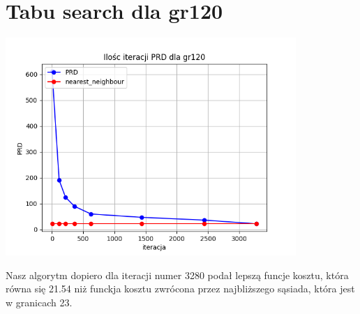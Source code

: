 \documentclass{article}
\begin{document}
    \section{Tabu search dla gr120}

    \includegraphics[width=11cm]{./spr2img/Figure_100.png}

    Nasz algorytm dopiero dla iteracji numer 3280 podał lepszą funcje kosztu, która 
    równa się 21.54 niż funckja kosztu zwrócona przez najbliższego sąsiada, która jest 
    w granicach 23. 
\end{document}
